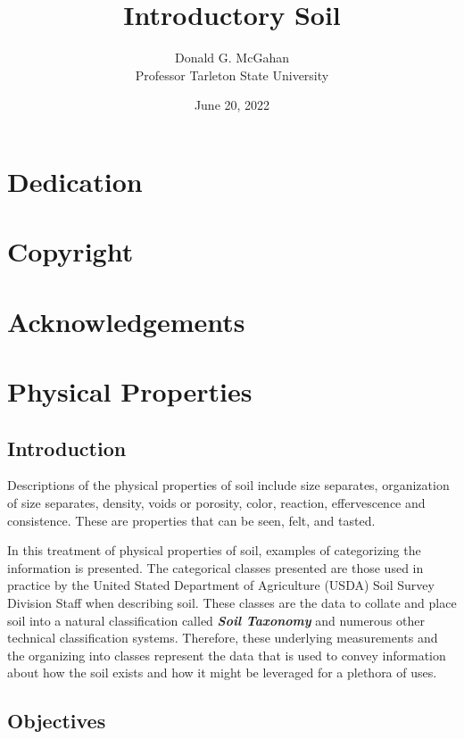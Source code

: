 \documentclass{book}
\title{Introductory Soil}
\author{Donald G. McGahan\\ Professor Tarleton State University}
\date{June 20, 2022}
\begin{document}
\maketitle

\frontmatter
\chapter{Dedication}
\chapter{Copyright}
\chapter{Acknowledgements}
\tableofcontents
\listoffigures
\listoftables
\mainmatter
\chapter{Physical Properties}
\section{Introduction}
\label{introduction}


Descriptions of the physical properties of soil include size separates, organization of size separates, density, voids or porosity, color, reaction, effervescence and consistence.  These are properties that can be seen, felt, and tasted.

In this treatment of physical properties of soil, examples of categorizing the information is presented. The categorical classes presented are those used in practice by the United Stated Department of Agriculture (USDA) Soil Survey Division Staff when describing soil. These classes are the data to collate and place soil into a natural classification called \textbf{\textit{Soil Taxonomy}} and numerous other technical classification systems. Therefore, these underlying measurements and the organizing into classes represent the data that is used to convey information about how the soil exists and how it might be leveraged for a plethora of uses.


\section{Objectives}
\label{objectives}

\end{document}
